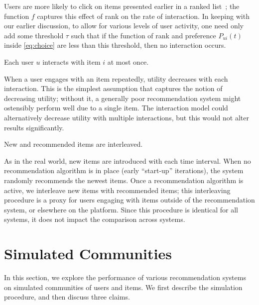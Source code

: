 \documentclass[sigconf]{acmart}
\begin{document}
\vspace{-3px}
Users are more likely to click on items presented earlier in a ranked list~\cite{jansen2013effect}; the function $f$ captures this effect of rank on the rate of interaction.  In keeping with our earlier discussion, to allow for various levels of user activity, one need only add some threshold $\tau$ such that if the function of rank and preference $P_{ui}(t)$ inside \cref{eq:choice} are less than this threshold, then no interaction occurs.

\begin{assumption}
	Each user $u$ interacts with item $i$ at most once.
\label{as:only_once}
\end{assumption}

\vspace{-3px}
When a user engages with an item repeatedly, utility decreases with each interaction.  This is the simplest assumption that captures the notion of decreasing utility; without it, a generally poor recommendation system might ostensibly perform well due to a single item.  The interaction model could alternatively decrease utility with multiple interactions, but this would not alter results significantly.

\begin{assumption}
	New and recommended items are interleaved.
\label{as:new_items}
\end{assumption}

\vspace{-3px}
As in the real world, new items are introduced with each time interval.  When no recommendation algorithm is in place (early ``start-up'' iterations), the system randomly recommends the newest items.  Once a recommendation algorithm is active, we interleave new items with recommended items; this interleaving procedure is a proxy for users engaging with items outside of the recommendation system, or elsewhere on the platform. Since this procedure is identical for all systems, it does not impact the comparison across systems.

\section{Simulated Communities}
\label{sec:simulations}
In this section, we explore the performance of various recommendation systems on simulated communities of users and items.  We first describe the simulation procedure, and then discuss three claims.
\end{document}
